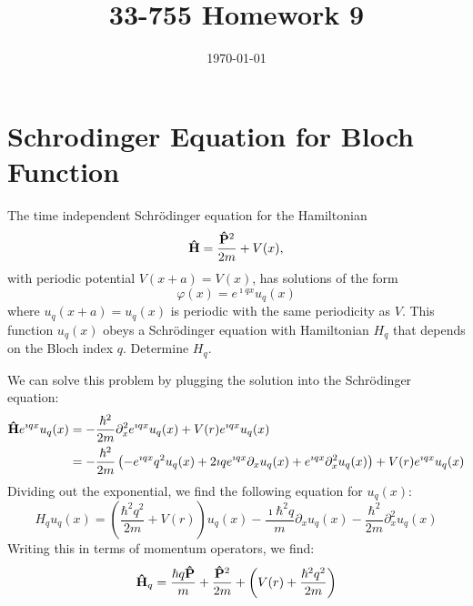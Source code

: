 \documentclass[a4paper,twoside]{article}
\title{33-755 Homework 9}
\date{\today}
\begin{document}
\maketitle

\section{Schrodinger Equation for Bloch Function}
The time independent Schr\"odinger equation for the Hamiltonian
\begin{equation}
    \vu{H} = \frac{\vu{P}^2}{2m} + V(x),
\end{equation}
with periodic potential $ V(x + a) = V(x) $, has solutions of the form
\begin{equation}
    \varphi(x) = e^{\imath q x} u_q(x)
\end{equation}
where $ u_q(x + a) = u_q(x) $ is periodic with the same periodicity as $ V $. This function $ u_q(x) $ obeys a Schr\"odinger equation with Hamiltonian $ H_q $ that depends on the Bloch index $ q $. Determine $ H_q $.

\begin{problem}
    We can solve this problem by plugging the solution into the Schr\"odinger equation:
    \begin{align}
        \vu{H} e^{\imath q x} u_q(x) &= - \frac{\hbar^2}{2 m} \partial_x^2 e^{\imath q x} u_q(x) + V(r) e^{\imath q x} u_q(x) \\
        &= - \frac{\hbar^2}{2m} \left( - e^{\imath q x} q^2 u_q(x) + 2 \imath q e^{\imath q x} \partial_x u_q(x) + e^{\imath q x} \partial_x^2 u_q(x) \right) + V(r) e^{\imath q x} u_q(x)
    \end{align}
    Dividing out the exponential, we find the following equation for $ u_q(x) $:
    \begin{equation}
        H_q u_q(x) = \left( \frac{\hbar^2 q^2}{2m} + V(r) \right) u_q(x) - \frac{\imath \hbar^2 q}{m} \partial_x u_q(x) - \frac{\hbar^2}{2m} \partial_x^2 u_q(x)
    \end{equation}
    Writing this in terms of momentum operators, we find:
    \begin{equation}
        \vu{H}_q = \frac{\hbar q \vu{P}}{m} + \frac{\vu{P}^2}{2m} + \left( V(r) + \frac{\hbar^2 q^2}{2m} \right)
    \end{equation}
\end{problem}
\end{document}
